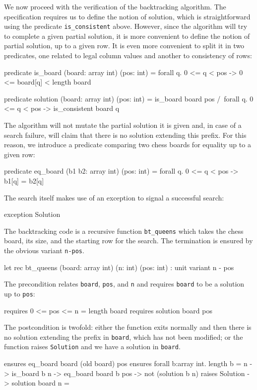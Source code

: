 We now proceed with the verification of the backtracking algorithm.
The specification requires us to define the notion of solution, which
is straightforward using the predicate \verb|is_consistent| above.
However, since the algorithm will try to complete a given partial
solution, it is more convenient to define the notion of partial
solution, up to a given row. It is even more convenient to split it in
two predicates, one related to legal column values and another to
consistency of rows:
\begin{whycode}
  predicate is_board (board: array int) (pos: int) =
    forall q. 0 <= q < pos -> 0 <= board[q] < length board

  predicate solution (board: array int) (pos: int) =
    is_board board pos /\
    forall q. 0 <= q < pos -> is_consistent board q
\end{whycode}
The algorithm will not mutate the partial solution it is given and,
in case of a search failure, will claim that there is no solution
extending this prefix. For this reason, we introduce a predicate
comparing two chess boards for equality up to a given row:
\begin{whycode}
  predicate eq_board (b1 b2: array int) (pos: int) =
    forall q. 0 <= q < pos -> b1[q] = b2[q]
\end{whycode}
The search itself makes use of an exception to signal a successful search:
\begin{whycode}
  exception Solution
\end{whycode}
The backtracking code is a recursive function \verb|bt_queens| which
takes the chess board, its size, and the starting row for the search.
The termination is ensured by the obvious variant \texttt{n-pos}.
\begin{whycode}
  let rec bt_queens (board: array int) (n: int) (pos: int) : unit
    variant  { n - pos }
\end{whycode}
The precondition relates \texttt{board}, \texttt{pos}, and \texttt{n}
and requires \texttt{board} to be a solution up to \texttt{pos}:
\begin{whycode}
    requires { 0 <= pos <= n = length board }
    requires { solution board pos }
\end{whycode}
The postcondition is twofold: either the function exits normally and
then there is no solution extending the prefix in \texttt{board},
which has not been modified;
or the function raises \texttt{Solution} and we have a solution in
\texttt{board}.
\begin{whycode}
    ensures  { eq_board board (old board) pos }
    ensures  { forall b:array int. length b = n -> is_board b n ->
                 eq_board board b pos -> not (solution b n) }
    raises   { Solution -> solution board n }
  =
\end{whycode}
